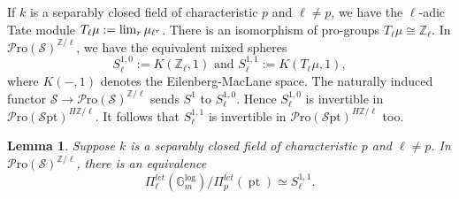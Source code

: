 \documentclass[11pt, a4paper]{amsart}
\newtheorem{lem}[thm]{Lemma}
\theoremstyle{definition}
\numberwithin{equation}{subsection}
\newcommand{\Z}{\mathbb{Z}}
\newcommand{\pt}[1]{\mathrm{\pt}_{#1}}
\newcommand{\limit}{\mathop{\rm lim}}
\newcommand{\leta}{{l\acute{e}t}}
\newcommand{\Eilenberg}{H}
\newcommand{\Gmm}{\mathbb{G}_m^{\mathrm{log}}}
\def\pt{\operatorname{pt}}
\newcommand{\infSpc}{\mathcal{S}}
\newcommand{\infSpt}{\mathcal{S}\mathrm{pt}}
\newcommand{\infPro}{\mathcal{P}\mathrm{ro}}
\begin{document}
If $k$ is a separably closed field of characteristic $p$ and $\ell\neq p$, 
we have the $\ell$-adic Tate module $T_{\ell}\mu:=\limit_r \mu_{\ell^r}$.
There is an isomorphism of pro-groups $T_{\ell}\mu \cong \Z_\ell$.
In $\infPro(\infSpc)^{\Z/\ell}$,
we have the equivalent mixed spheres
\[
S_{\ell}^{1,0}:=K(\Z_\ell,1)
\text{ and }
S_{\ell}^{1,1}:=K(T_\ell \mu,1),
\]
where $K(-,1)$ denotes the Eilenberg-MacLane space. 
The naturally induced functor $\infSpc\to \infPro(\infSpc)^{\Z/\ell}$ sends $S^1$ to $S_\ell^{1,0}$.
Hence $S_\ell^{1,0}$ is invertible in $\infPro(\infSpt)^{\Eilenberg \Z/\ell}$.
It follows that $S_{\ell}^{1,1}$ is invertible in 
$\infPro(\infSpt)^{\Eilenberg \Z/\ell}$ too.

\begin{lem}
\label{ketreal.12}
Suppose $k$ is a separably closed field of characteristic $p$ and $\ell\neq p$.
In $\infPro(\infSpc)^{\Z/\ell}$, 
there is an equivalence
\[
\Pi_{\ell}^{\leta}(\Gmm)/\Pi_p^{\leta}(\pt)
\simeq
S_{\ell}^{1,1}.
\]
\end{lem}
\end{document}
